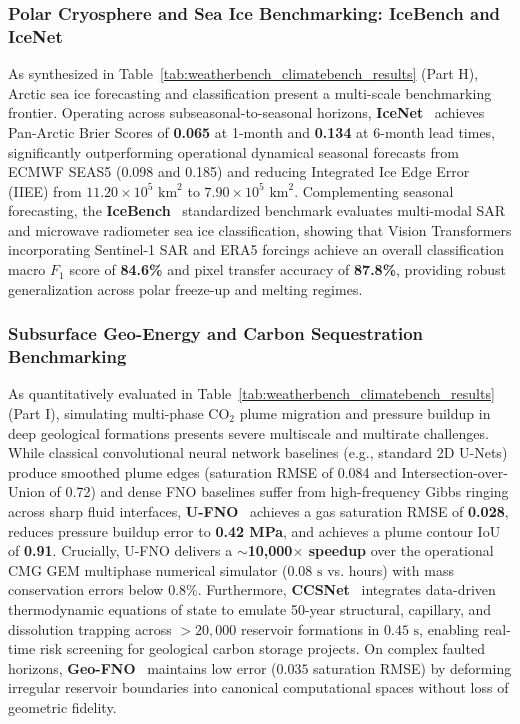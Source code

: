 \subsubsection{Polar Cryosphere and Sea Ice Benchmarking: IceBench and IceNet}
As synthesized in Table~\ref{tab:weatherbench_climatebench_results} (Part H), Arctic sea ice forecasting and classification present a multi-scale benchmarking frontier. Operating across subseasonal-to-seasonal horizons, \textbf{IceNet}~\cite{andersson2021icenet} achieves Pan-Arctic Brier Scores of \textbf{0.065} at 1-month and \textbf{0.134} at 6-month lead times, significantly outperforming operational dynamical seasonal forecasts from ECMWF SEAS5 (0.098 and 0.185) and reducing Integrated Ice Edge Error (IIEE) from $11.20 \times 10^5\text{ km}^2$ to \textbf{$7.90 \times 10^5\text{ km}^2$}. Complementing seasonal forecasting, the \textbf{IceBench}~\cite{taleghan2025icebench} standardized benchmark evaluates multi-modal SAR and microwave radiometer sea ice classification, showing that Vision Transformers incorporating Sentinel-1 SAR and ERA5 forcings achieve an overall classification macro $F_1$ score of \textbf{84.6\%} and pixel transfer accuracy of \textbf{87.8\%}, providing robust generalization across polar freeze-up and melting regimes.

\subsubsection{Subsurface Geo-Energy and Carbon Sequestration Benchmarking}
As quantitatively evaluated in Table~\ref{tab:weatherbench_climatebench_results} (Part I), simulating multi-phase $\text{CO}_2$ plume migration and pressure buildup in deep geological formations presents severe multiscale and multirate challenges. While classical convolutional neural network baselines (e.g., standard 2D U-Nets) produce smoothed plume edges (saturation RMSE of 0.084 and Intersection-over-Union of 0.72) and dense FNO baselines suffer from high-frequency Gibbs ringing across sharp fluid interfaces, \textbf{U-FNO}~\cite{wen2022ufno} achieves a gas saturation RMSE of \textbf{0.028}, reduces pressure buildup error to \textbf{0.42 MPa}, and achieves a plume contour IoU of \textbf{0.91}. Crucially, U-FNO delivers a \textbf{$\sim$10,000$\times$ speedup} over the operational CMG GEM multiphase numerical simulator ($0.08\text{ s}$ vs. hours) with mass conservation errors below $0.8\%$. Furthermore, \textbf{CCSNet}~\cite{wen2021ccsnet} integrates data-driven thermodynamic equations of state to emulate 50-year structural, capillary, and dissolution trapping across $>20{,}000$ reservoir formations in $0.45\text{ s}$, enabling real-time risk screening for geological carbon storage projects. On complex faulted horizons, \textbf{Geo-FNO}~\cite{li2022geofno} maintains low error ($0.035$ saturation RMSE) by deforming irregular reservoir boundaries into canonical computational spaces without loss of geometric fidelity.

